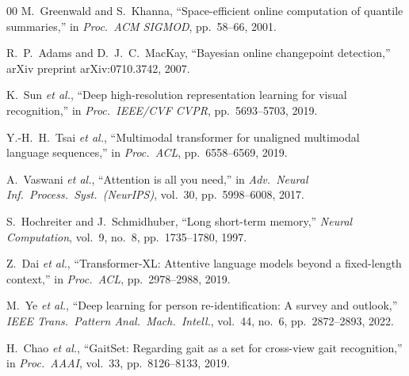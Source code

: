\documentclass[conference]{IEEEtran}
\begin{document}
\begin{thebibliography}{00}
M.~Greenwald and S.~Khanna,
``Space-efficient online computation of quantile summaries,''
in \textit{Proc.\ ACM SIGMOD}, pp.~58--66, 2001.

R.~P.~Adams and D.~J.~C.~MacKay,
``Bayesian online changepoint detection,''
arXiv preprint arXiv:0710.3742, 2007.

K.~Sun \textit{et al.},
``Deep high-resolution representation learning for visual recognition,''
in \textit{Proc.\ IEEE/CVF CVPR}, pp.~5693--5703, 2019.

Y.-H.~H.~Tsai \textit{et al.},
``Multimodal transformer for unaligned multimodal language sequences,''
in \textit{Proc.\ ACL}, pp.~6558--6569, 2019.

A.~Vaswani \textit{et al.},
``Attention is all you need,''
in \textit{Adv.\ Neural Inf.\ Process.\ Syst.\ (NeurIPS)}, vol.~30,
pp.~5998--6008, 2017.

S.~Hochreiter and J.~Schmidhuber,
``Long short-term memory,''
\textit{Neural Computation}, vol.~9, no.~8, pp.~1735--1780, 1997.

Z.~Dai \textit{et al.},
``Transformer-XL: Attentive language models beyond a fixed-length context,''
in \textit{Proc.\ ACL}, pp.~2978--2988, 2019.

M.~Ye \textit{et al.},
``Deep learning for person re-identification: A survey and outlook,''
\textit{IEEE Trans.\ Pattern Anal.\ Mach.\ Intell.}, vol.~44, no.~6,
pp.~2872--2893, 2022.

H.~Chao \textit{et al.},
``GaitSet: Regarding gait as a set for cross-view gait recognition,''
in \textit{Proc.\ AAAI}, vol.~33, pp.~8126--8133, 2019.

\end{thebibliography}
\end{document}

